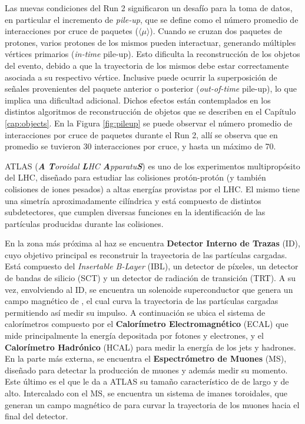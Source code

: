Las nuevas condiciones del Run 2 significaron un desafío para la toma de datos, en particular el incremento de \textit{pile-up}, que se define como el número promedio de interacciones por cruce de paquetes ($\langle \mu \rangle$). Cuando se cruzan dos paquetes de protones, varios protones de los mismos pueden interactuar, generando múltiples vértices primarios (\textit{in-time} pile-up). Esto dificulta la reconstrucción de los objetos del evento, debido a que la trayectoria de los mismos debe estar correctamente asociada a su respectivo vértice. Inclusive puede ocurrir la superposición de señales provenientes del paquete anterior o posterior (\textit{out-of-time} pile-up), lo que implica una dificultad adicional. Dichos efectos están contemplados en los distintos algoritmos de reconstrucción de objetos que se describen en el Capítulo \ref{cap:objects}. En la Figura \ref{fig:pileup} se puede observar el número promedio de interacciones por cruce de paquetes durante el Run 2, allí se observa que en promedio se tuvieron 30 interacciones por cruce, y hasta un máximo de 70. 




ATLAS (\textit{\textbf{A} \textbf{T}oroidal \textbf{L}HC \textbf{A}pparatu\textbf{S}})  \cite{PERF-2007-01} es uno de los experimentos multipropósito del LHC, diseñado para estudiar las colisiones protón-protón (y también colisiones de iones pesados) a altas energías provistas por el LHC. El mismo tiene una simetría aproximadamente cilíndrica y está compuesto de distintos subdetectores, que cumplen diversas funciones en la identificación de las partículas producidas durante las colisiones. 

En la zona más próxima al haz se encuentra \textbf{Detector Interno de Trazas} (ID), cuyo objetivo principal es reconstruir la trayectoria de las partículas cargadas. Está compuesto del \textit{Insertable B-Layer} (IBL), un detector de píxeles, un detector de bandas de silicio (SCT) y un detector de radiación de transición (TRT). A su vez, envolviendo al ID, se encuentra un solenoide superconductor que genera un campo magnético de , el cual curva la trayectoria de las partículas cargadas permitiendo así medir su impulso. A continuación se ubica el sistema de calorímetros compuesto por el \textbf{Calorímetro Electromagnético} (ECAL) que mide principalmente la energía depositada por fotones y electrones, y el \textbf{Calorímetro Hadrónico} (HCAL) para medir la energía de los jets y hadrones. En la parte más externa, se encuentra el \textbf{Espectrómetro de Muones} (MS), diseñado para detectar la producción de muones y además medir su momento. Este último es el que le da a ATLAS su tamaño característico de  de largo y  de alto. Intercalado con el MS, se encuentra un sistema de imanes toroidales, que generan un campo magnético de  para curvar la trayectoria de los muones hacia el final del detector.

